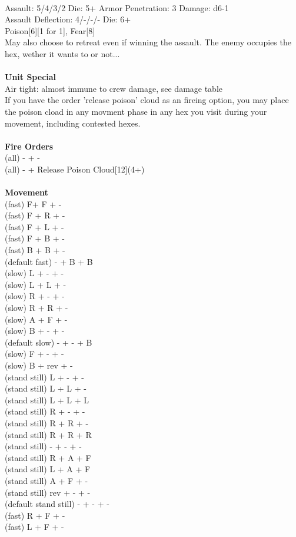 \ \\
Assault: 5/4/3/2 Die: 5+ Armor Penetration: 3 Damage: d6-1 \\
Assault Deflection: 4/-/-/- Die: 6+\\
\indent Poison[6][1 for 1], Fear[8] \\ May also choose to retreat even if winning the assault. The enemy occupies the hex, wether it wants to or not... \\
\ \\

{\bf Unit Special} \\
Air tight: almost immune to crew damage, see damage table\\If you have the order 'release poison' cloud as an fireing option, you may place the poison cload in any movment phase in any hex you visit during your movement, including contested hexes.
\ \\


\ \\ {\bf Fire Orders } \\
(all) - + -  \\
(all) - + Release Poison Cloud[12](4+) \\
\ \\ {\bf Movement } \\
(fast) F+ F + - \\
(fast) F + R + - \\
(fast) F + L + - \\
(fast) F + B + - \\
(fast) B + B + - \\
(default fast) - + B + B \\
(slow) L + - + - \\
(slow) L + L + - \\
(slow) R + - + - \\
(slow) R + R + - \\
(slow) A + F + - \\
(slow) B + - + - \\
(default slow) - + - + B \\
(slow) F + - + - \\
(slow) B + rev + - \\
(stand still) L + - + - \\
(stand still) L + L + - \\
(stand still) L + L + L \\
(stand still) R + - + - \\
(stand still) R + R + - \\
(stand still) R + R + R \\
(stand still) - + - + - \\
(stand still) R + A + F \\
(stand still) L + A + F \\
(stand still) A + F + - \\
(stand still) rev + - + - \\
(default stand still) - + - + - \\
(fast) R + F + - \\
(fast) L + F + - \\




